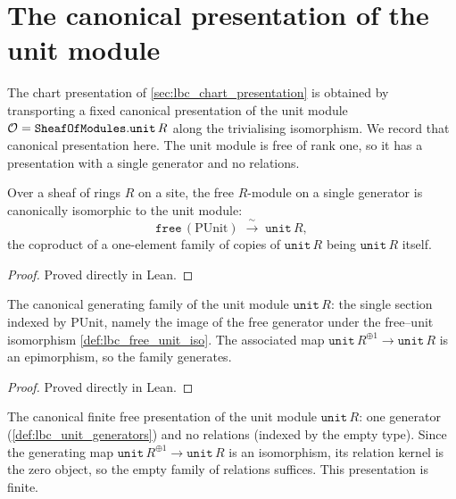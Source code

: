 \section{The canonical presentation of the unit module}
\label{sec:lbc_unit_presentation}

The chart presentation of \cref{sec:lbc_chart_presentation} is obtained by
transporting a fixed canonical presentation of the unit module
\(\mathcal{O}_{} = \mathtt{SheafOfModules.unit}\,R\) along the trivialising
isomorphism. We record that canonical presentation here. The unit module is free
of rank one, so it has a presentation with a single generator and no relations.

\begin{definition}\leanok
  \label{def:lbc_free_unit_iso}
  Over a sheaf of rings \(R\) on a site, the free \(R\)-module on a single
  generator is canonically isomorphic to the unit module:
  \[
    \mathtt{free}\,(\mathrm{PUnit}) \;\xrightarrow{\ \sim\ }\; \mathtt{unit}\,R,
  \]
  the coproduct of a one-element family of copies of \(\mathtt{unit}\,R\) being
  \(\mathtt{unit}\,R\) itself.
\end{definition}

\begin{proof}

\leanok
  Proved directly in Lean.
\end{proof}

\begin{definition}\leanok
  \label{def:lbc_unit_generators}
  The canonical generating family of the unit module \(\mathtt{unit}\,R\): the
  single section indexed by \(\mathrm{PUnit}\), namely the image of the free
  generator under the free–unit isomorphism \cref{def:lbc_free_unit_iso}. The
  associated map \(\mathtt{unit}\,R^{\oplus 1} \to \mathtt{unit}\,R\) is an
  epimorphism, so the family generates.
\end{definition}

\begin{proof}

\leanok
  Proved directly in Lean.
\end{proof}

\begin{definition}\leanok
  \label{def:lbc_unit_presentation}
  The canonical finite free presentation of the unit module \(\mathtt{unit}\,R\):
  one generator (\cref{def:lbc_unit_generators}) and no relations (indexed by the
  empty type). Since the generating map \(\mathtt{unit}\,R^{\oplus 1} \to
  \mathtt{unit}\,R\) is an isomorphism, its relation kernel is the zero object,
  so the empty family of relations suffices. This presentation is finite.
\end{definition}

